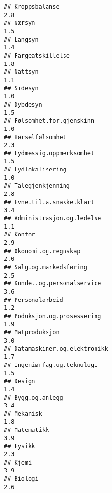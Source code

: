 \documentclass[
]{article}
\begin{document}
\begin{verbatim}
## Kroppsbalanse                                                                    2.8
## Nærsyn                                                                           1.5
## Langsyn                                                                          1.4
## Fargeatskillelse                                                                 1.8
## Nattsyn                                                                          1.1
## Sidesyn                                                                          1.0
## Dybdesyn                                                                         1.5
## Følsomhet.for.gjenskinn                                                          1.0
## Hørselfølsomhet                                                                  2.3
## Lydmessig.oppmerksomhet                                                          1.5
## Lydlokalisering                                                                  1.0
## Talegjenkjenning                                                                 2.8
## Evne.til.å.snakke.klart                                                          3.4
## Administrasjon.og.ledelse                                                        1.1
## Kontor                                                                           2.9
## Økonomi.og.regnskap                                                              2.0
## Salg.og.markedsføring                                                            2.5
## Kunde..og.personalservice                                                        3.6
## Personalarbeid                                                                   1.2
## Poduksjon.og.prosessering                                                        1.9
## Matproduksjon                                                                    3.0
## Datamaskiner.og.elektronikk                                                      1.7
## Ingeniørfag.og.teknologi                                                         1.5
## Design                                                                           1.4
## Bygg.og.anlegg                                                                   3.4
## Mekanisk                                                                         1.8
## Matematikk                                                                       3.9
## Fysikk                                                                           2.3
## Kjemi                                                                            3.9
## Biologi                                                                          2.6

\end{verbatim}
\end{document}
